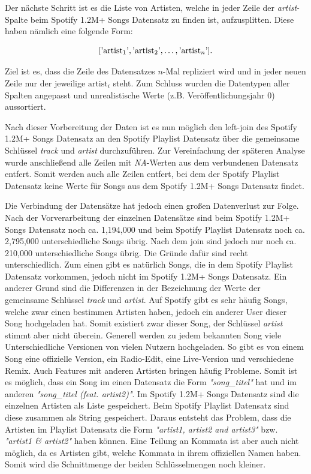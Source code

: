 \documentclass[conference]{IEEEtran}
\begin{document}
Der nächste Schritt ist es die Liste von Artisten, welche in jeder Zeile der \textit{artist}-Spalte beim Spotify 1.2M+ Songs Datensatz zu finden ist, aufzusplitten. Diese haben nämlich eine folgende Form:

$$
    [\text'\text{artist}_1\text', \text'\text{artist}_2\text', \dots, \text'\text{artist}_n\text'].
$$

Ziel ist es, dass die Zeile des Datensatzes $n$-Mal repliziert wird und in jeder neuen Zeile nur der jeweilige $\text{artist}_i$ steht. Zum Schluss wurden die Datentypen aller Spalten angepasst und unrealistische Werte (z.B. Veröffentlichungsjahr 0) aussortiert. 

Nach dieser Vorbereitung der Daten ist es nun möglich den left-join des Spotify 1.2M+ Songs Datensatz an den Spotify Playlist Datensatz über die gemeinsame Schlüssel \textit{track} und \textit{artist} durchzuführen. Zur Vereinfachung der späteren Analyse wurde anschließend alle Zeilen mit \textit{NA}-Werten aus dem verbundenen Datensatz entfert. Somit werden auch alle Zeilen entfert, bei dem der Spotify Playlist Datensatz keine Werte für Songs aus dem Spotify 1.2M+ Songs Datensatz findet.

Die Verbindung der Datensätze hat jedoch einen großen Datenverlust zur Folge. Nach der Vorverarbeitung der einzelnen Datensätze sind beim Spotify 1.2M+ Songs Datensatz noch ca. 1,194,000 und beim Spotify Playlist Datensatz noch ca. 2,795,000 unterschiedliche Songs übrig. Nach dem join sind jedoch nur noch ca. 210,000 unterschiedliche Songs übrig. Die Gründe dafür sind recht unterschiedlich. Zum einen gibt es natürlich Songs, die in dem Spotify Playlist Datensatz vorkommen, jedoch nicht im Spotify 1.2M+ Songs Datensatz. Ein anderer Grund sind die Differenzen in der Bezeichnung der Werte der gemeinsame Schlüssel \textit{track} und \textit{artist}. Auf Spotify gibt es sehr häufig Songs, welche zwar einen bestimmen Artisten haben, jedoch ein anderer User dieser Song hochgeladen hat. Somit existiert zwar dieser Song, der Schlüssel \textit{artist} stimmt aber nicht überein. Generell werden zu jedem bekannten Song viele Unterschiedliche Versionen von vielen Nutzern hochgeladen. So gibt es von einem Song eine offizielle Version, ein Radio-Edit, eine Live-Version und verschiedene Remix. Auch Features mit anderen Artisten bringen häufig Probleme. Somit ist es möglich, dass ein Song im einen Datensatz die Form \textit{"song\_titel"} hat und im anderen \textit{"song\_titel (feat. artist2)"}. Im Spotify 1.2M+ Songs Datensatz sind die einzelnen Artisten als Liste gespeichert. Beim Spotify Playlist Datensatz sind diese zusammen als String gespeichert. Daraus entsteht das Problem, dass die Artisten im Playlist Datensatz die Form \textit{"artist1, artist2 and artist3"} bzw. \textit{"artist1 \& artist2"} haben können. Eine Teilung an Kommata ist aber auch nicht möglich, da es Artisten gibt, welche Kommata in ihrem offiziellen Namen haben. Somit wird die Schnittmenge der beiden Schlüsselmengen noch kleiner.
\end{document}
